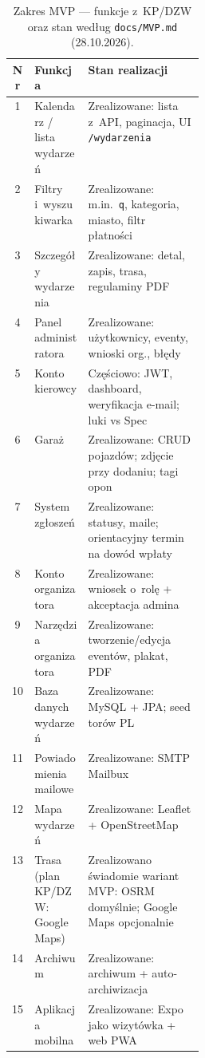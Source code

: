 \documentclass{sprz}
\begin{document}
\begin{table}[ht]
  \centering
  \caption{Zakres MVP --- funkcje z~KP/DZW oraz stan według \texttt{docs/\allowbreak MVP.md} (28.10.2026).}
  \label{tab:mvp-zakres}
  {\small
  \renewcommand{\arraystretch}{1.05}
  \begin{tabularx}{\linewidth}{|c|>{\raggedright\arraybackslash}p{0.28\linewidth}|>{\raggedright\arraybackslash}X|}
    \hline
    \textbf{Nr} & \textbf{Funkcja} & \textbf{Stan realizacji} \\
    \hline
    1 & Kalendarz / lista wydarzeń & Zrealizowane: lista z~API, paginacja, UI \texttt{/wydarzenia} \\
    \hline
    2 & Filtry i~wyszukiwarka & Zrealizowane: m.in.\ \texttt{q}, kategoria, miasto, filtr płatności \\
    \hline
    3 & Szczegóły wydarzenia & Zrealizowane: detal, zapis, trasa, regulaminy PDF \\
    \hline
    4 & Panel administratora & Zrealizowane: użytkownicy, eventy, wnioski org., błędy \\
    \hline
    5 & Konto kierowcy & Częściowo: JWT, dashboard, weryfikacja e-mail; luki vs Spec \\
    \hline
    6 & Garaż & Zrealizowane: CRUD pojazdów; zdjęcie przy dodaniu; tagi opon \\
    \hline
    7 & System zgłoszeń & Zrealizowane: statusy, maile; orientacyjny termin na dowód wpłaty \\
    \hline
    8 & Konto organizatora & Zrealizowane: wniosek o~rolę + akceptacja admina \\
    \hline
    9 & Narzędzia organizatora & Zrealizowane: tworzenie/edycja eventów, plakat, PDF \\
    \hline
    10 & Baza danych wydarzeń & Zrealizowane: MySQL + JPA; seed torów PL \\
    \hline
    11 & Powiadomienia mailowe & Zrealizowane: SMTP Mailbux \\
    \hline
    12 & Mapa wydarzeń & Zrealizowane: Leaflet + OpenStreetMap \\
    \hline
    13 & Trasa (plan KP/DZW: Google Maps) & Zrealizowano świadomie wariant MVP: OSRM domyślnie; Google Maps opcjonalnie \\
    \hline
    14 & Archiwum & Zrealizowane: archiwum + auto-archiwizacja \\
    \hline
    15 & Aplikacja mobilna & Zrealizowane: Expo jako wizytówka + web PWA \\
    \hline
  \end{tabularx}
  }
\end{table}
\end{document}
